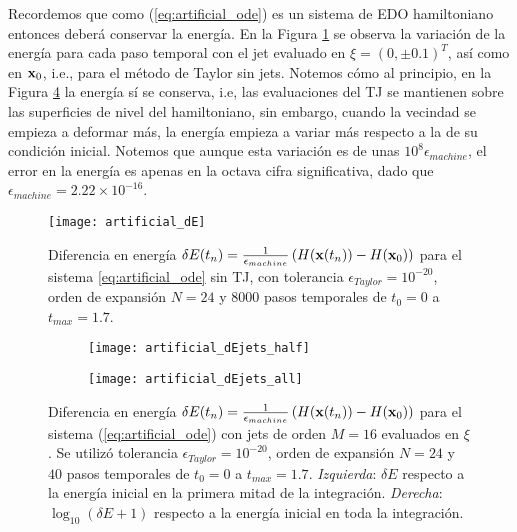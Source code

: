 Recordemos que como (\ref{eq:artificial_ode}) es un sistema de EDO hamiltoniano entonces deberá conservar la energía. En la Figura \ref{fig:artificial_dE} se observa la variación de la energía para cada paso temporal con el jet evaluado en $\xi = (0,\pm 0.1)^T$, así como en $\mathbf{x}_0$, i.e., para el método de Taylor sin jets. Notemos cómo al principio, en la Figura \ref{fig:artificial_dEjets} la energía sí se conserva, i.e, las evaluaciones del TJ se mantienen sobre las superficies de nivel del hamiltoniano, sin embargo, cuando la vecindad se empieza a deformar más, la energía empieza a variar más respecto a la de su condición inicial. Notemos que aunque esta variación es de unas $10^8 \epsilon_{machine}$, el error en la energía es apenas en la octava cifra significativa, dado que $\epsilon_{machine} = 2.22\times 10^{-16}$.

\begin{figure}[h!]
 \centering
 \texttt{[image: artificial\_dE]}
 \caption{Diferencia en energía $\delta E(t_n) = \frac{1}{\epsilon_{machine}} \left( H(\mathbf{x}(t_n)) - H(\mathbf{x}_0) \right)$ para el sistema \ref{eq:artificial_ode} sin TJ, con tolerancia $\epsilon_{Taylor} = 10^{-20}$, orden de expansión $N = 24$ y $8000$ pasos temporales de $t_0 = 0$ a $t_{max} = 1.7$.}
 \label{fig:artificial_dE}
\end{figure}

\begin{figure}[h!]
\centering
\begin{subfigure}{0.49\textwidth}
	\centering
	\texttt{[image: artificial\_dEjets\_half]}
	\label{fig:artificial_dEjets_half}
\end{subfigure}
%
\begin{subfigure}{0.49\textwidth}
	\centering
	\texttt{[image: artificial\_dEjets\_all]}
	\label{fig:artificial_dEjets_all}
\end{subfigure}
\caption{Diferencia en energía $\delta E(t_n) = \frac{1}{\epsilon_{machine}} \left( H(\mathbf{x}(t_n)) - H(\mathbf{x}_0) \right)$ para el sistema (\ref{eq:artificial_ode}) con jets de orden $M=16$ evaluados en $\xi$. Se utilizó tolerancia $\epsilon_{Taylor} = 10^{-20}$, orden de expansión $N = 24$ y $40$ pasos temporales de $t_0 = 0$ a $t_{max} = 1.7$. \textit{Izquierda}: $\delta E$ respecto a la energía inicial en la primera mitad de la integración. \textit{Derecha}:  $\log_10(\delta E + 1)$ respecto a la energía inicial en toda la integración. }
\label{fig:artificial_dEjets}
\end{figure}


